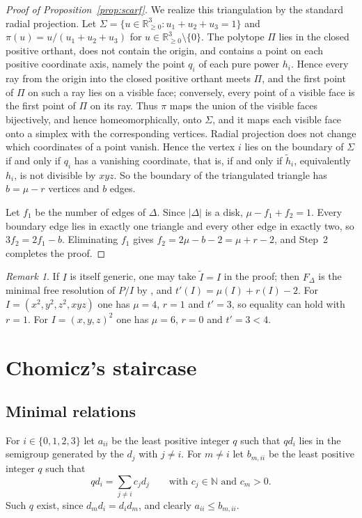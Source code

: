 \documentclass{amsart}
\theoremstyle{definition}
\theoremstyle{remark}
\newtheorem{remark}[theorem]{Remark}
\numberwithin{equation}{section}
\newcommand{\N}{\mathbb{N}}
\newcommand{\R}{\mathbb{R}}
\begin{document}
\begin{proof}[Proof of Proposition~\textup{\ref{prop:scarf}}]
We realize this triangulation by the standard radial projection. Let $\Sigma=\{u\in\R^3_{\ge0} : u_1+u_2+u_3=1\}$ and $\pi(u)=u/(u_1+u_2+u_3)$ for $u\in\R^3_{\ge0}\setminus\{0\}$. The polytope $\Pi$ lies in the closed positive orthant, does not contain the origin, and contains a point on each positive coordinate axis, namely the point $q_i$ of each pure power $h_i$. Hence every ray from the origin into the closed positive orthant meets $\Pi$, and the first point of $\Pi$ on such a ray lies on a visible face; conversely, every point of a visible face is the first point of $\Pi$ on its ray. Thus $\pi$ maps the union of the visible faces bijectively, and hence homeomorphically, onto $\Sigma$, and it maps each visible face onto a simplex with the corresponding vertices. Radial projection does not change which coordinates of a point vanish. Hence the vertex $i$ lies on the boundary of $\Sigma$ if and only if $q_i$ has a vanishing coordinate, that is, if and only if $\tilde h_i$, equivalently $h_i$, is not divisible by $xyz$. So the boundary of the triangulated triangle has $b=\mu-r$ vertices and $b$ edges.

Let $f_1$ be the number of edges of $\Delta$. Since $|\Delta|$ is a disk, $\mu-f_1+f_2=1$. Every boundary edge lies in exactly one triangle and every other edge in exactly two, so $3f_2=2f_1-b$. Eliminating $f_1$ gives $f_2=2\mu-b-2=\mu+r-2$, and Step~2 completes the proof.
\end{proof}

\begin{remark}
If $I$ is itself generic, one may take $\tilde I=I$ in the proof; then $F_\Delta$ is the minimal free resolution of $P/I$ by \cite[Theorem~3.2]{BPS98}, and $t'(I)=\mu(I)+r(I)-2$. For $I=(x^2,y^2,z^2,xyz)$ one has $\mu=4$, $r=1$ and $t'=3$, so equality can hold with $r=1$. For $I=(x,y,z)^2$ one has $\mu=6$, $r=0$ and $t'=3<4$.
\end{remark}

\section{Chomicz's staircase}\label{sec:staircase}

\subsection{Minimal relations}

For $i\in\{0,1,2,3\}$ let $a_{ii}$ be the least positive integer $q$ such that $qd_i$ lies in the semigroup generated by the $d_j$ with $j\neq i$. For $m\neq i$ let $b_{m,ii}$ be the least positive integer $q$ such that
\[
qd_i=\sum_{j\neq i}c_jd_j\qquad\text{with } c_j\in\N \text{ and } c_m>0 .
\]
Such $q$ exist, since $d_md_i=d_id_m$, and clearly $a_{ii}\le b_{m,ii}$.
\end{document}
